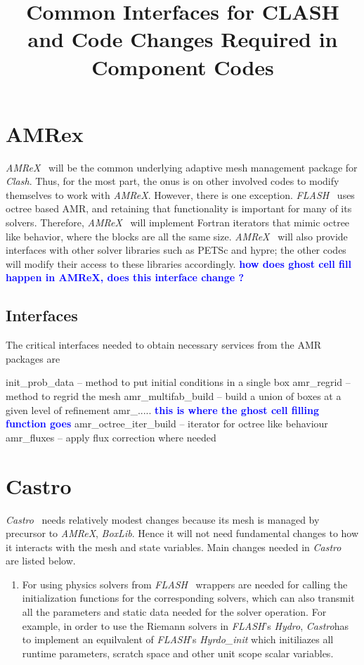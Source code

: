 \documentclass{article}
\title{Common Interfaces for CLASH and Code Changes Required in
Component Codes}
\newcommand{\mynote}[1]{\textcolor{blue}{{\bf#1}}}
\newcommand{\flash}{{\it FLASH}}
\newcommand{\amrex}{{\it AMReX}}
\newcommand{\castro}{{\it Castro}}
\newcommand{\clash}{{\it Clash}}
\newcommand{\chimera}{{\it Chimera}}
\begin{document}
\maketitle



\section{AMRex}
\label{sec:amrex}
\amrex~ will be the common underlying adaptive mesh management package
for \clash. Thus, for the most part, the onus is on other involved
codes to modify themselves to work with \amrex. However, there is one
exception. \flash~ uses octree based AMR, and retaining that
functionality is important for many of its solvers. Therefore, \amrex~
will implement Fortran iterators that mimic octree like behavior,
where the blocks are all the same size. \amrex~ will also provide
interfaces with other solver libraries such as PETSc and hypre; the
other codes will modify their access to these libraries accordingly.
\mynote{how does ghost cell fill happen in AMReX, does this interface
  change ?}
\subsection{Interfaces}
\label{sec:amrex-interfaces}
The critical interfaces needed to obtain necessary services from the
AMR packages are
\begin{itemize}
\itemize init\_prob\_data -- method to put initial conditions in a
single box
\itemize amr_regrid -- method to regrid the mesh
\itemize amr_multifab_build -- build a union of boxes at a given level
of refinement
\itemize amr_..... \mynote{this is where the ghost cell filling
  function goes}
\itemize amr_octree_iter_build -- iterator for octree like behaviour
\itemize amr_fluxes -- apply flux correction where needed
\end{itemize}


\section{Castro}
\label{sec:castro}
\castro~ needs relatively modest changes because its mesh is managed by
precursor to \amrex, {\it BoxLib}. Hence it will not need fundamental
changes to how it interacts with the mesh and state variables. Main
changes needed in \castro~ are listed below.
\begin{enumerate}
\item For using physics solvers from \flash~ wrappers are needed for
calling the initialization functions for the corresponding solvers,
which can also transmit all the parameters and static data needed for
the solver operation. For example, in order to use the Riemann solvers
in \flash's {\it Hydro}, \castro has to implement an equilvalent of
\flash's {\it Hyrdo\_init} which initiliazes all runtime parameters, 
scratch space and other unit scope scalar variables.
\end{enumerate}
\end{document}
